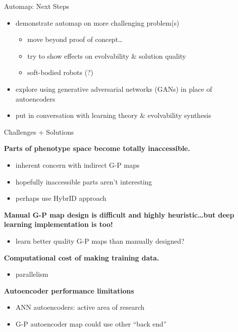 \begin{frame}{Automap: Next Steps}

\begin{itemize}[<+->]
\item demonstrate automap on more challenging problem(s)
\begin{itemize}
\item move beyond proof of concept\dots
\item try to show effects on evolvability \& solution quality
\item soft-bodied robots (?)
\end{itemize}
\item explore using generative adversarial networks (GANs) in place of autoencoders
\item put in conversation with learning theory \& evolvability synthesis \cite{kouvaris2017evolution}
\end{itemize}

\end{frame}


\begin{frame}{Challenges + Solutions}

  \textbf{Parts of phenotype space become totally inaccessible.}
  \pause
  \vspace{-1ex}
  \begin{itemize}[<+->]
  \itemsep0em
  \item inherent concern with indirect G-P maps \cite{clune2008generative}
  \item hopefully inaccessible parts aren't interesting
  \item perhaps use HybrID approach \cite{clune2009hybrid}
  \end{itemize}
  \vspace{-1ex}
  \pause


\textbf{Manual G-P map design is difficult and highly heuristic\dots but deep
learning implementation is too!}
\pause
\vspace{-1ex}
\begin{itemize}[<+->]
\itemsep0em
\item learn better quality G-P maps than manually designed?
\end{itemize}
\vspace{-1ex}
\pause


\textbf{Computational cost of making training data.}
\pause
\vspace{-1ex}
\begin{itemize}[<+->]
\itemsep0em
\item parallelism
\end{itemize}
\vspace{-1ex}
\pause


\textbf{Autoencoder performance limitations}
\pause
\vspace{-1ex}
\begin{itemize}[<+->]
\itemsep0em
\item ANN autoencoders: active area of research
\item G-P autoencoder map could use other ``back end''
\end{itemize}

\end{frame}

